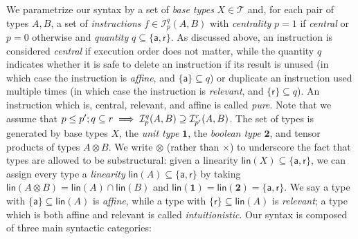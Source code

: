 \documentclass[acmsmall,screen,review]{acmart}
\newcommand{\mc}[1]{\ensuremath{\mathcal{#1}}}
\newcommand{\mb}[1]{\ensuremath{\mathbf{#1}}}
\newcommand{\ms}[1]{\ensuremath{\mathsf{#1}}}
\newcommand{\taff}{{\{\ms{a}\}}}
\newcommand{\trel}{{\{\ms{r}\}}}
\newcommand{\tint}{{\{\ms{a}, \ms{r}\}}}
\begin{document}
We parametrize our syntax by a set of \textit{base types} \(X \in \mc{T}\) and,
for each pair of types \(A, B\), a set of \textit{instructions} \(f \in
\mc{I}^q_p(A, B)\) with \textit{centrality} \(p = 1\) if \textit{central} or \(p
= 0\) otherwise and \textit{quantity} \(q \subseteq \tint\). As discussed above,
an instruction is considered \textit{central} if execution order does not
matter, while the quantity \(q\) indicates whether it is safe to delete an
instruction if its result is unused (in which case the instruction is
\textit{affine}, and \(\taff \subseteq q\)) or duplicate an instruction used
multiple times (in which case the instruction is \textit{relevant}, and \(\trel
\subseteq q\)). An instruction which is, central, relevant, and affine is called
\textit{pure}. Note that we assume that \(p \leq p' \and q \subseteq r \implies
\mc{I}_p^q(A, B) \supseteq \mc{I}_{p'}^{r}(A, B)\). The set of types is
generated by base types \(X\), the \textit{unit type} \(\mb{1}\), the
\textit{boolean type} \(\mb{2}\), and tensor products of types \(A \otimes B\).
We write \(\otimes\) (rather than \(\times\)) to underscore the fact that types
are allowed to be substructural: given a linearity \(\ms{lin}(X) \subseteq
\tint\), we can assign every type a \textit{linearity} \(\ms{lin}(A) \subseteq
\tint\) by taking \(\ms{lin}(A \otimes B) = \ms{lin}(A) \cap \ms{lin}(B)\) and
\(\ms{lin}(\mb{1}) = \ms{lin}(\mb{2}) = \tint\). We say a type with \(\taff
\subseteq \ms{lin}(A)\) is \textit{affine}, while a type with \(\trel \subseteq
\ms{lin}(A)\) is \textit{relevant}; a type which is both affine and relevant is
called \textit{intuitionistic}. Our syntax is composed of three main syntactic
categories:
\end{document}

